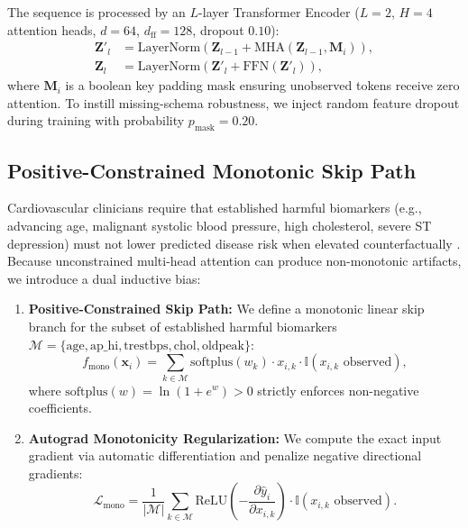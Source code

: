 \documentclass[journal]{IEEEtran}
\begin{document}
The sequence is processed by an $L$-layer Transformer Encoder ($L=2$, $H=4$ attention heads, $d=64$, $d_{\text{ff}}=128$, dropout $0.10$):
\begin{align}
\mathbf{Z}'_l &= \text{LayerNorm}(\mathbf{Z}_{l-1} + \text{MHA}(\mathbf{Z}_{l-1}, \mathbf{M}_i)), \\
\mathbf{Z}_l &= \text{LayerNorm}(\mathbf{Z}'_l + \text{FFN}(\mathbf{Z}'_l)),
\end{align}
where $\mathbf{M}_i$ is a boolean key padding mask ensuring unobserved tokens receive zero attention. To instill missing-schema robustness, we inject random feature dropout during training with probability $p_{\text{mask}} = 0.20$.

\subsection{Positive-Constrained Monotonic Skip Path}
Cardiovascular clinicians require that established harmful biomarkers (e.g., advancing age, malignant systolic blood pressure, high cholesterol, severe ST depression) must not lower predicted disease risk when elevated counterfactually \cite{collins2024}. Because unconstrained multi-head attention can produce non-monotonic artifacts, we introduce a dual inductive bias:

\begin{enumerate}
    \item \textbf{Positive-Constrained Skip Path:} We define a monotonic linear skip branch for the subset of established harmful biomarkers $\mathcal{M} = \{\text{age}, \text{ap\_hi}, \text{trestbps}, \text{chol}, \text{oldpeak}\}$:
    \begin{equation}
    f_{\text{mono}}(\mathbf{x}_i) = \sum_{k \in \mathcal{M}} \text{softplus}(w_k) \cdot x_{i,k} \cdot \mathbb{I}(x_{i,k} \text{ observed}),
    \end{equation}
    where $\text{softplus}(w) = \ln(1 + e^w) > 0$ strictly enforces non-negative coefficients.
    \item \textbf{Autograd Monotonicity Regularization:} We compute the exact input gradient via automatic differentiation and penalize negative directional gradients:
    \begin{equation}
    \mathcal{L}_{\text{mono}} = \frac{1}{|\mathcal{M}|} \sum_{k \in \mathcal{M}} \text{ReLU}\left( -\frac{\partial \hat{y}_i}{\partial x_{i,k}} \right) \cdot \mathbb{I}(x_{i,k} \text{ observed}).
    \end{equation}
\end{enumerate}
\end{document}
